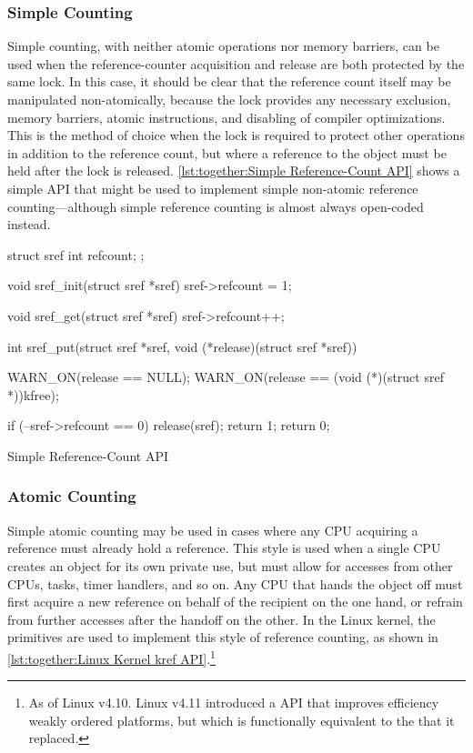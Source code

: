 \subsubsection{Simple Counting}
\label{sec:together:Simple Counting}

Simple counting, with neither atomic operations nor memory barriers,
can be used when the reference-counter acquisition and release are
both protected by the same lock.
In this case, it should be clear that the reference count itself
may be manipulated non-atomically, because the lock provides any
necessary exclusion, memory barriers, atomic instructions, and disabling
of compiler optimizations.
This is the method of choice when the lock is required to protect
other operations in addition to the reference count, but where
a reference to the object must be held after the lock is released.
\cref{lst:together:Simple Reference-Count API} shows a simple
API that might be used to implement simple non-atomic reference
counting---although simple reference counting is almost always
open-coded instead.

\begin{listing}
\begin{fcvlabel}
\begin{VerbatimL}[commandchars=\\\[\]]
struct sref {
	int refcount;
};

void sref_init(struct sref *sref)
{
	sref->refcount = 1;
}

void sref_get(struct sref *sref)
{
	sref->refcount++;
}

int sref_put(struct sref *sref,
             void (*release)(struct sref *sref))
{
	WARN_ON(release == NULL);
	WARN_ON(release == (void (*)(struct sref *))kfree);

	if (--sref->refcount == 0) {
		release(sref);
		return 1;
	}
	return 0;
}
\end{VerbatimL}
\end{fcvlabel}
\caption{Simple Reference-Count API}
\label{lst:together:Simple Reference-Count API}
\end{listing}

\subsubsection{Atomic Counting}
\label{sec:together:Atomic Counting}

Simple atomic counting may be used in cases where any CPU acquiring
a reference must already hold a reference.
This style is used when a single CPU creates an object for its own private
use, but must allow for accesses from other CPUs, tasks, timer handlers,
and so on.
Any CPU that hands the object off must first acquire a new reference on
behalf of the recipient on the one hand, or refrain from further accesses
after the handoff on the other.
In the Linux kernel, the  primitives are used to implement
this style of reference counting, as shown in
\cref{lst:together:Linux Kernel kref API}.\footnote{
	As of Linux v4.10.
	Linux v4.11 introduced a  API that improves
	efficiency weakly ordered platforms, but which is functionally
	equivalent to the  that it replaced.}

